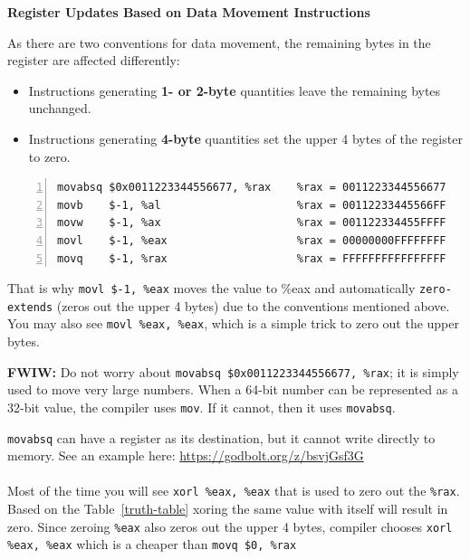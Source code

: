 \documentclass{article}
\begin{document}
\noindent\textbf{Register Updates Based on Data Movement Instructions}

\vspace{5pt}

As there are two conventions for data movement, the remaining bytes in the register are affected differently:
\begin{itemize}
    \item Instructions generating \textbf{1- or 2-byte} quantities leave the remaining bytes unchanged.
    \item Instructions generating \textbf{4-byte} quantities set the upper 4 bytes of the register to zero.
\end{itemize}

\vspace{10pt}

\begin{lstlisting}[basicstyle=\ttfamily, frame=none, numbers=left, numberstyle=\color{blue}]
movabsq $0x0011223344556677, %rax    %rax = 0011223344556677
movb    $-1, %al                     %rax = 00112233445566FF
movw    $-1, %ax                     %rax = 001122334455FFFF
movl    $-1, %eax                    %rax = 00000000FFFFFFFF
movq    $-1, %rax                    %rax = FFFFFFFFFFFFFFFF
\end{lstlisting}

That is why \texttt{movl \$-1, \%eax} moves the value to \%eax and automatically \texttt{zero-extends} (zeros out the upper 4 bytes) due to the conventions mentioned above. You may also see \texttt{movl \%eax, \%eax}, which is a simple trick to zero out the upper bytes.

\textbf{FWIW:} Do not worry about \texttt{movabsq \$0x0011223344556677, \%rax}; it is simply used to move very large numbers. When a 64-bit number can be represented as a 32-bit value, the compiler uses \texttt{mov}. If it cannot, then it uses \texttt{movabsq}. 

\texttt{movabsq} can have a register as its destination, but it cannot write directly to memory. See an example here:
\url{https://godbolt.org/z/bsvjGsf3G} \\
\\
Most of the time you will see \texttt{xorl \%eax, \%eax} that is used to zero out the \texttt{\%rax}. Based on the Table~\ref{truth-table} xoring the same value with itself will result in zero. Since zeroing \texttt{\%eax} also zeros out the upper 4 bytes, compiler chooses \texttt{xorl \%eax, \%eax} which is a cheaper than \texttt{movq \$0, \%rax}\\
\end{document}
